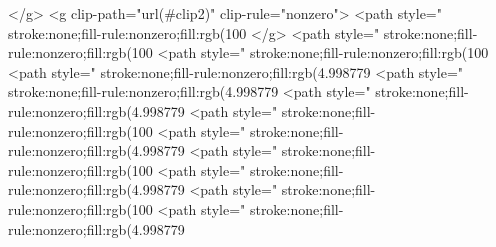 </g>
<g clip-path="url(#clip2)" clip-rule="nonzero">
<path style=" stroke:none;fill-rule:nonzero;fill:rgb(100%
</g>
<path style=" stroke:none;fill-rule:nonzero;fill:rgb(100%
<path style=" stroke:none;fill-rule:nonzero;fill:rgb(100%
<path style=" stroke:none;fill-rule:nonzero;fill:rgb(4.998779%
<path style=" stroke:none;fill-rule:nonzero;fill:rgb(4.998779%
<path style=" stroke:none;fill-rule:nonzero;fill:rgb(4.998779%
<path style=" stroke:none;fill-rule:nonzero;fill:rgb(100%
<path style=" stroke:none;fill-rule:nonzero;fill:rgb(4.998779%
<path style=" stroke:none;fill-rule:nonzero;fill:rgb(100%
<path style=" stroke:none;fill-rule:nonzero;fill:rgb(4.998779%
<path style=" stroke:none;fill-rule:nonzero;fill:rgb(100%
<path style=" stroke:none;fill-rule:nonzero;fill:rgb(4.998779%
